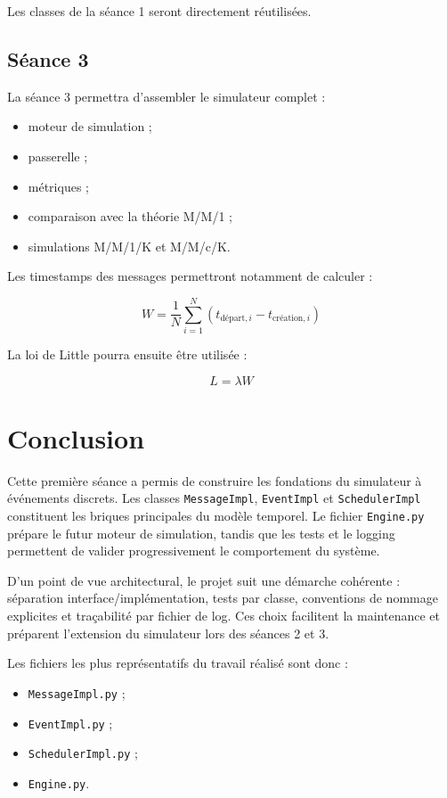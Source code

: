 \documentclass{article}
\begin{document}
Les classes de la séance 1 seront directement réutilisées.

\subsection{Séance 3}

La séance 3 permettra d’assembler le simulateur complet :
\begin{itemize}[leftmargin=*]
    \item moteur de simulation ;
    \item passerelle ;
    \item métriques ;
    \item comparaison avec la théorie M/M/1 ;
    \item simulations M/M/1/K et M/M/c/K.
\end{itemize}

Les timestamps des messages permettront notamment de calculer :

\[
W = \frac{1}{N}\sum_{i=1}^{N}(t_{\text{départ},i} - t_{\text{création},i})
\]

La loi de Little pourra ensuite être utilisée :

\[
L = \lambda W
\]

\section{Conclusion}

Cette première séance a permis de construire les fondations du simulateur à événements discrets. Les classes \texttt{MessageImpl}, \texttt{EventImpl} et \texttt{SchedulerImpl} constituent les briques principales du modèle temporel. Le fichier \texttt{Engine.py} prépare le futur moteur de simulation, tandis que les tests et le logging permettent de valider progressivement le comportement du système.

D’un point de vue architectural, le projet suit une démarche cohérente : séparation interface/implémentation, tests par classe, conventions de nommage explicites et traçabilité par fichier de log. Ces choix facilitent la maintenance et préparent l’extension du simulateur lors des séances 2 et 3.

Les fichiers les plus représentatifs du travail réalisé sont donc :
\begin{itemize}[leftmargin=*]
    \item \texttt{MessageImpl.py} ;
    \item \texttt{EventImpl.py} ;
    \item \texttt{SchedulerImpl.py} ;
    \item \texttt{Engine.py}.
\end{itemize}
\end{document}
